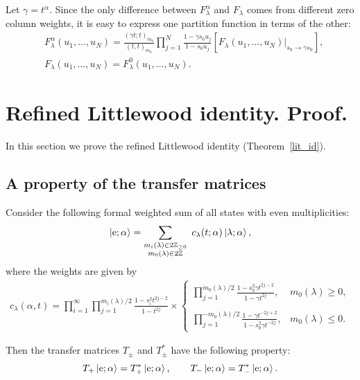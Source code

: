 \documentclass[ALCO,Unicode]{cedram}
\newcommand{\ket}[1]{\left|#1\right\rangle}
\begin{document}
Let $\gamma = t^{\alpha}$. Since the only difference between $F^{\alpha}_\lambda$ and $F_\lambda$ comes from different zero column weights, it is easy to express one partition function in terms of the other: 
\begin{equation}
\label{F_alpha}
\begin{split}
&F^{\alpha}_\lambda(u_1, \dots, u_N) = \frac{(\gamma t; t)_{m_0}}{( t, t)_{m_0}} \prod_{j=1}^{N} \frac{1 - \gamma s_0 u_j}{1 - s_0 u_j}
\left[ F_{\lambda}(u_1, \dots, u_N)
\Big\vert_{\text{$s_0\to \gamma s_0$}}\right],\\
&F_{\lambda}(u_1, \dots, u_N) = F^{0}_{\lambda}(u_1, \dots, u_N).
\end{split}
\end{equation}

\section{Refined Littlewood identity. Proof.}
\label{sec:sHL_proof}

In this section we prove the refined Littlewood identity (Theorem~\ref{lit_id}).
\subsection{A property of the transfer matrices}
\begin{lemma} \label{lem_T_op}
	Consider the following formal weighted sum of all states with even multiplicities:
	\begin{align*}
	\label{e-vect}
	\ket{\rm e;\alpha}
	=
	\sum_{\substack{
			m_{i}(\lambda) \in 2 \mathbb{Z}_{\geq 0} \\ m_0(\lambda) \in 2 \mathbb{Z} 
	}}
	\
	c_{\lambda}(t; \alpha)
	\ket{\lambda;\alpha},
	\end{align*}
	where the weights are given by
	\begin{align*}
	c_{\lambda}(\alpha,t) 
	= 
	\prod_{i = 1}^{\infty} \prod_{j = 1}^{m_{i}(\lambda) / 2} \frac{1 - s_{i}^2 t^{2j - 2}}{1 - t^{2j}}
	\times
	\left\{
	\begin{array}{cl}
	\displaystyle{
		\prod_{j = 1}^{m_{0}(\lambda) / 2} \frac{1 - s_{0}^2 \gamma t^{2j - 2}}{1 - \gamma t^{2j}}
	},
	&
	m_0(\lambda) \geq 0,
	\\ \\ 
	\displaystyle{
		\prod_{j=1}^{-m_0(\lambda)/2}
		\frac{1 - \gamma t^{-2j+2}}{1 - s_{0}^2 \gamma t^{-2j}}
	},
	&
	m_0(\lambda) \leq 0.
	\end{array}
	\right.
	\end{align*}
	
	Then the transfer matrices $T_{\pm}$ and $T^{*}_{\pm}$ have the following property:
	\begin{equation} \label{eq: lem_T_op}
	T_{+}\ket{\rm e;\alpha} = T^{*}_{+}\ket{\rm e;\alpha}, \quad\quad T_{-}\ket{\rm e;\alpha} = T^{*}_{-}\ket{\rm e;\alpha}.
	\end{equation}
\end{lemma}
\end{document}
